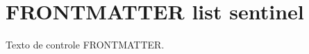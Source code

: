 \documentclass{abntexto-ufc}
\begin{document}
\pretextual

\ufcPrintListOfTables

\textual
\section{FRONTMATTER list sentinel}
Texto de controle FRONTMATTER.
\end{document}
